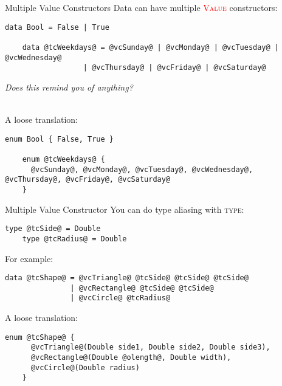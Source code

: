 \documentclass[xcolor={usenames,dvipsnames}]{beamer}
\newcommand{\hkeyword}[1]{\textcolor{TealBlue}{\textsc{#1}}}
\newcommand{\hvalcon}[1]{\textcolor{Red}{\textsc{#1}}}
\begin{document}
\begin{frame}[fragile]{Multiple Value Constructors}
  Data can have multiple \hvalcon{Value} constructors:
  \begin{lstlisting}[style=hask]
    data Bool = False | True

    data @tcWeekdays@ = @vcSunday@ | @vcMonday@ | @vcTuesday@ | @vcWednesday@
                  | @vcThursday@ | @vcFriday@ | @vcSaturday@
  \end{lstlisting}
  \textit{\tiny{Does this remind you of anything?}}

  \pause
  \ \\
  A loose translation:
  \begin{lstlisting}[style=hask]
    enum Bool { False, True }

    enum @tcWeekdays@ {
      @vcSunday@, @vcMonday@, @vcTuesday@, @vcWednesday@, @vcThursday@, @vcFriday@, @vcSaturday@
    }
  \end{lstlisting}
\end{frame}

\begin{frame}[fragile]{Multiple Value Constructor}
  You can do type aliasing with \hkeyword{type}:
  \begin{lstlisting}[style=hask]
    type @tcSide@ = Double
    type @tcRadius@ = Double
  \end{lstlisting}

  \pause
  For example:
  \begin{lstlisting}[style=hask]
    data @tcShape@ = @vcTriangle@ @tcSide@ @tcSide@ @tcSide@
               | @vcRectangle@ @tcSide@ @tcSide@
               | @vcCircle@ @tcRadius@
  \end{lstlisting}

  \pause
  A loose translation:
  \begin{lstlisting}[style=hask]
    enum @tcShape@ {
      @vcTriangle@(Double side1, Double side2, Double side3),
      @vcRectangle@(Double @olength@, Double width),
      @vcCircle@(Double radius)
    }
  \end{lstlisting}
\end{frame}
\end{document}
